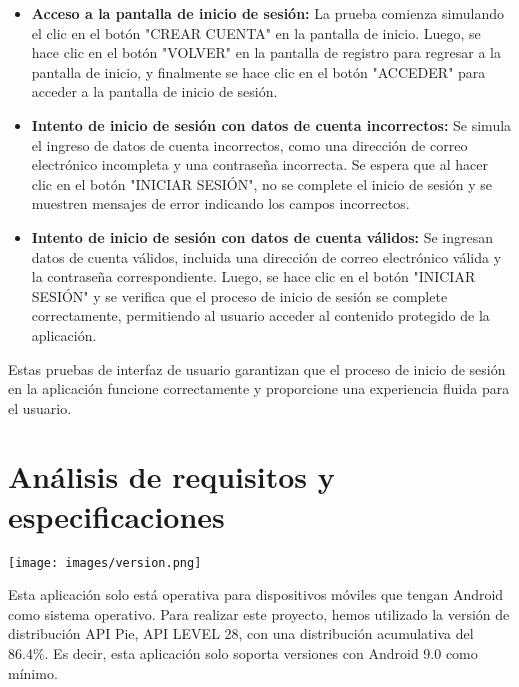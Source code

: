 \documentclass{article}
\begin{document}
\begin{itemize}
    \item \textbf{Acceso a la pantalla de inicio de sesión:} La prueba comienza simulando el clic en el botón "CREAR CUENTA" en la pantalla de inicio. Luego, se hace clic en el botón "VOLVER" en la pantalla de registro para regresar a la pantalla de inicio, y finalmente se hace clic en el botón "ACCEDER" para acceder a la pantalla de inicio de sesión.
    
    \item \textbf{Intento de inicio de sesión con datos de cuenta incorrectos:} Se simula el ingreso de datos de cuenta incorrectos, como una dirección de correo electrónico incompleta y una contraseña incorrecta. Se espera que al hacer clic en el botón "INICIAR SESIÓN", no se complete el inicio de sesión y se muestren mensajes de error indicando los campos incorrectos.
    
    \item \textbf{Intento de inicio de sesión con datos de cuenta válidos:} Se ingresan datos de cuenta válidos, incluida una dirección de correo electrónico válida y la contraseña correspondiente. Luego, se hace clic en el botón "INICIAR SESIÓN" y se verifica que el proceso de inicio de sesión se complete correctamente, permitiendo al usuario acceder al contenido protegido de la aplicación.
\end{itemize}

Estas pruebas de interfaz de usuario garantizan que el proceso de inicio de sesión en la aplicación funcione correctamente y proporcione una experiencia fluida para el usuario.









\section{Análisis de requisitos y especificaciones}

    \begin{minipage}{0.4\textwidth}
        \texttt{[image: images/version.png]}
    \end{minipage}
    \hfill
    \begin{minipage}{0.55\textwidth}
    Esta aplicación solo está operativa para dispositivos móviles que tengan Android como sistema operativo. Para realizar este proyecto, hemos utilizado la versión de distribución API Pie, API LEVEL 28, con una distribución acumulativa del 86.4\%. Es decir, esta aplicación solo soporta versiones con Android 9.0 como mínimo.
    \end{minipage}
\end{document}
